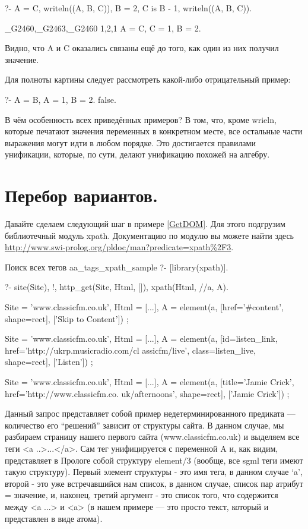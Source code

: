 \documentclass[a4paper]{book}
\begin{document}
\begin{example}{}{}
?- A = C, writeln((A, B, C)), B = 2, C is B - 1, writeln((A, B,
  C)).

_G2460,_G2463,_G2460
1,2,1
A = C, C = 1,
B = 2.
\end{example}

Видно, что A и C оказались связаны ещё до того, как один из них
получил значение.

Для полноты картины следует рассмотреть какой-либо отрицательный
пример:

\begin{example}{}{}
?- A = B, A = 1, B = 2.
false.
\end{example}

В чём особенность всех приведённых примеров? В том, что, кроме
wrieln, которые печатают значения переменных в конкретном месте,
все остальные части выражения могут идти в любом порядке. Это
достигается правилами унификации, которые, по сути, делают
унификацию похожей на алгебру.

\section{Перебор вариантов.}

Давайте сделаем следующий шаг в примере \ref{GetDOM}. Для этого
подгрузим библиотечный модуль xpath. Документацию по модулю вы
можете найти здесь
\url{http://www.swi-prolog.org/pldoc/man?predicate=xpath%2F3}.

\begin{example}{Поиск всех тегов a}{a_tags_xpath_sample}
?- [library(xpath)].

?- site(Site), !, http_get(Site, Html, []), xpath(Html, //a, A).

Site = 'www.classicfm.co.uk',
Html = [...],       
A = element(a, [href='#content', shape=rect], ['Skip to
  Content']) 
;                                                                

Site = 'www.classicfm.co.uk',
Html = [...],       
A = element(a, [id=listen_link, href='http://ukrp.musicradio.com/cl
assicfm/live', class=listen_live, shape=rect], ['Listen']) 
;
      
Site = 'www.classicfm.co.uk',
Html = [...],       
A = element(a, [title='Jamie Crick', href='http://www.classicfm.co.
uk/afternoons', shape=rect], ['Jamie Crick'])
;

\end{example}

Данный запрос представляет собой пример недетерминированного
предиката --- количество его ``решений'' зависит от структуры
сайта. В данном случае, мы разбираем страницу нашего первого
сайта (www.classicfm.co.uk) и выделяем все теги <a
..>...</a>. Сам тег унифицируется с переменной A и, как видим,
представляет в Прологе собой структуру element/3 (вообще, все
sgml теги имеют такую структуру). Первый элемент структуры - это
имя тега, в данном случае `a', второй - это уже встречавшийся нам
список, в данном случае, список пар атрибут = значение, и,
наконец, третий аргумент - это список того, что содержится между
<a ...> и <a> (в нашем примере --- это просто текст, который и
представлен в виде атома).
\end{document}

